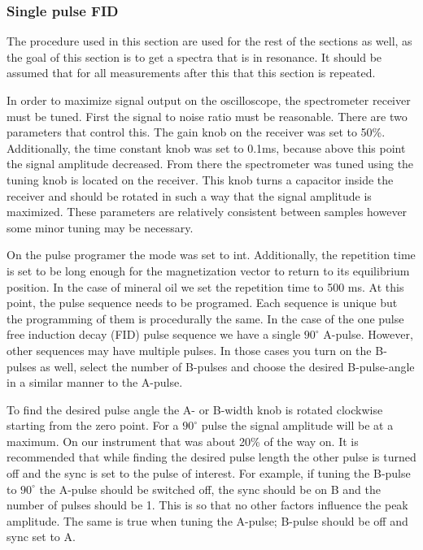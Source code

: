 \documentclass[
reprint,
amsmath,amssymb,
aps,
tikz,
border=5pt
]{revtex4-1}
\begin{document}
\subsubsection*{Single pulse FID}
    
    The procedure used in this section are used for the rest of the sections as well, as the goal of this section is to get a spectra that is in resonance. It should be assumed that for all measurements after this that this section is repeated.

    In order to maximize signal output on the oscilloscope, the spectrometer receiver must be tuned. First the signal to noise ratio must be reasonable. There are two parameters that control this. The gain knob on the receiver was set to 50\%. Additionally, the time constant knob was set to 0.1ms, because above this point the signal amplitude decreased. From there the spectrometer was tuned using the tuning knob is located on the receiver. This knob turns a capacitor inside the receiver and should be rotated in such a way that the signal amplitude is maximized. These parameters are relatively consistent between samples however some minor tuning may be necessary.

    On the pulse programer the mode was set to int. Additionally, the repetition time is set to be long enough for the magnetization vector to return to its equilibrium position. In the case of mineral oil we set the repetition time to 500 ms. At this point, the pulse sequence needs to be programed. Each sequence is unique but the programming of them is procedurally the same. In the case of the one pulse free induction decay (FID) pulse sequence we have a single $90^\circ$ A-pulse. However, other sequences may have multiple pulses. In those cases you turn on the B-pulses as well, select the number of B-pulses and choose the desired B-pulse-angle in a similar manner to the A-pulse. 

    To find the desired pulse angle the A- or B-width knob is rotated clockwise starting from the zero point. For a $90^\circ$ pulse the signal amplitude will be at a maximum. On our instrument that was about 20\% of the way on. It is recommended that while finding the desired pulse length the other pulse is turned off and the sync is set to the pulse of interest. For example, if tuning the B-pulse to $90^\circ$ the A-pulse should be switched off, the sync should be on B and the number of pulses should be 1. This is so that no other factors influence the peak amplitude. The same is true when tuning the A-pulse; B-pulse should be off and sync set to A. 
\end{document}
